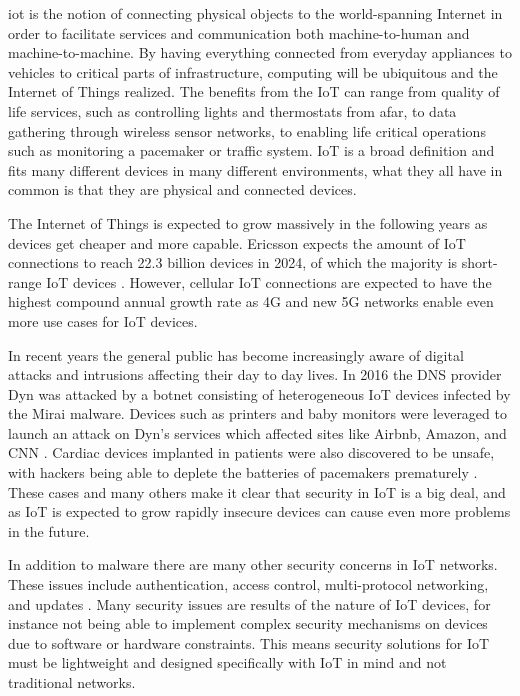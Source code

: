 \documentclass[0-thesis.tex]{subfiles}
\begin{document}
\gls{iot} is the notion of connecting physical objects to the
world-spanning Internet in order to facilitate services and communication both
machine-to-human and machine-to-machine. By having everything connected from everyday
appliances to vehicles to critical parts of infrastructure, computing will be ubiquitous
and the Internet of Things realized. The benefits from the IoT can range from quality of
life services, such as controlling lights and thermostats from afar, to data gathering
through wireless sensor networks, to enabling life critical operations such as monitoring
a pacemaker or traffic system. IoT is a broad definition and fits many different devices
in many different environments, what they all have in common is that they are physical and
connected devices.

The Internet of Things is expected to grow massively in the following years as devices get
cheaper and more capable. Ericsson expects the amount of IoT connections to reach 22.3
billion devices in 2024, of which the majority is short-range IoT devices
\parencite{ericsson-mobility-report}. However, cellular IoT connections are expected to
have the highest compound annual growth rate as 4G and new 5G networks enable even more
use cases for IoT devices.

In recent years the general public has become increasingly aware of digital attacks and
intrusions affecting their day to day lives. In 2016 the DNS provider Dyn was attacked by
a botnet consisting of heterogeneous IoT devices infected by the Mirai malware. Devices
such as printers and baby monitors were leveraged to launch an attack on Dyn's services
which affected sites like Airbnb, Amazon, and CNN \parencite{perlroth_2016}. Cardiac
devices implanted in patients were also discovered to be unsafe, with hackers being able
to deplete the batteries of pacemakers prematurely \parencite{hern_2017}. These cases and
many others make it clear that security in IoT is a big deal, and as IoT is expected to
grow rapidly insecure devices can cause even more problems in the future.

In addition to malware there are many other security concerns in IoT networks. These
issues include authentication, access control, multi-protocol networking, and updates
\parencite{jing2014, hossain2015, alrawais2017}. Many security issues are results of the
nature of IoT devices, for instance not being able to implement complex security
mechanisms on devices due to software or hardware constraints. This means security
solutions for IoT must be lightweight and designed specifically with IoT in mind and not
traditional networks.
\end{document}
